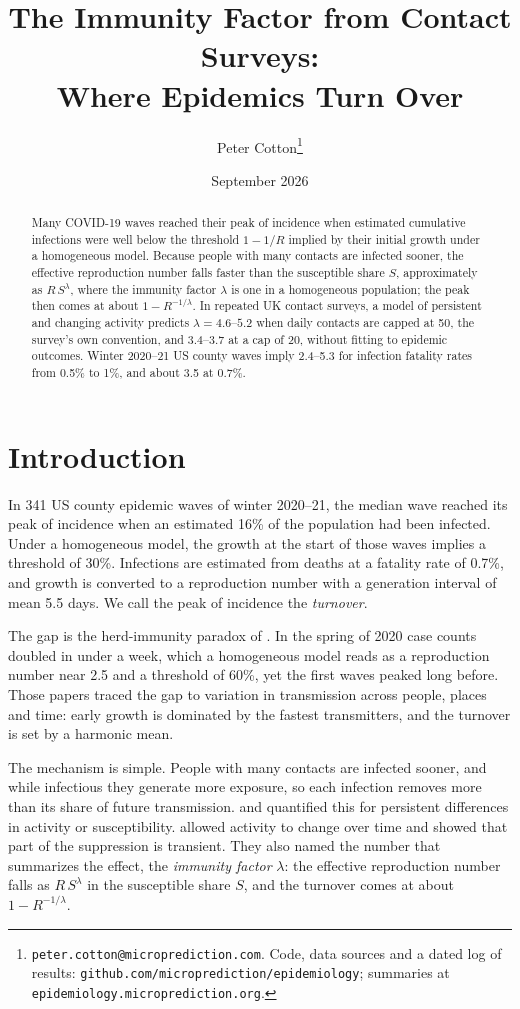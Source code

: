 \documentclass[11pt]{article}
\title{The Immunity Factor from Contact Surveys:\\ Where Epidemics Turn Over}
\author{Peter Cotton\thanks{\texttt{peter.cotton@microprediction.com}. Code, data sources and a dated log of
results: \texttt{github.com/microprediction/epidemiology}; summaries at
\texttt{epidemiology.microprediction.org}.}}
\date{September 2026}
\theoremstyle{remark}
\begin{document}
\maketitle

\begin{abstract}
Many COVID-19 waves reached their peak of incidence when estimated cumulative infections were well below the
threshold $1 - 1/R$ implied by their initial growth under a homogeneous model. Because people with many contacts are
infected sooner, the effective reproduction number falls faster than the susceptible share $S$, approximately as
$R\,S^{\lambda}$, where the immunity factor $\lambda$ is one in a homogeneous population; the peak then comes at about
$1 - R^{-1/\lambda}$. In repeated UK contact surveys, a model of persistent and changing activity predicts
$\lambda = 4.6$--$5.2$ when daily contacts are capped at 50, the survey's own convention, and 3.4--3.7 at a cap of 20,
without fitting to epidemic outcomes. Winter 2020--21 US county waves imply 2.4--5.3 for infection fatality rates from
0.5\% to 1\%, and about 3.5 at 0.7\%.
\end{abstract}

\section{Introduction}

In 341 US county epidemic waves of winter 2020--21, the median wave reached its peak of incidence when an estimated
16\% of the population had been infected. Under a homogeneous model, the growth at the start of those waves implies
a threshold of 30\%. Infections are estimated from deaths at a fatality rate of 0.7\%, and growth is converted to a
reproduction number with a generation interval of mean 5.5 days. We call the peak of incidence the \emph{turnover}.

The gap is the herd-immunity paradox of \citet{cotton2020fundamental,cotton2020herd}. In the spring of 2020 case
counts doubled in under a week, which a homogeneous model reads as a reproduction number near 2.5 and a threshold of
60\%, yet the first waves peaked long before. Those papers traced the gap to variation in transmission across
people, places and time: early growth is dominated by the fastest transmitters, and the turnover is set by a harmonic
mean.

The mechanism is simple. People with many contacts are infected sooner, and while infectious they generate more
exposure, so each infection removes more than its share of future transmission. \citet{britton2020} and
\citet{gomes2022} quantified this for persistent differences in activity or susceptibility. \citet{tkachenko2021}
allowed activity to change over time and showed that part of the suppression is transient. They also named the
number that summarizes the effect, the \emph{immunity factor} $\lambda$: the effective reproduction number falls as
$R\,S^{\lambda}$ in the susceptible share $S$, and the turnover comes at about $1 - R^{-1/\lambda}$.
\end{document}
